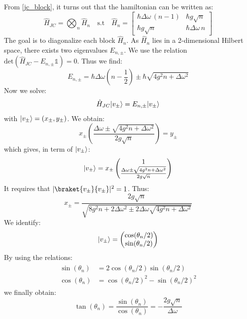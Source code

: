 \documentclass[11pt]{report}
\DeclarePairedDelimiter\ket{\lvert}{\rangle}
\begin{document}
From \ref{jc_block}, it turns out that the hamiltonian can be written as:
\begin{equation}
\hat{H}_{JC} = \bigotimes_n \hat{H}_n \quad \textrm{s.t} \quad \hat{H}_n = \begin{bmatrix}
\hbar \Delta\omega \, (n-1) & \hbar g \sqrt{n}\\
\hbar g \sqrt{n} & \hbar \Delta\omega \, n
\end{bmatrix}
\end{equation}
The goal is to diagonalize each block $\hat{H}_n$. As $\hat{H}_n$ lies in a 2-dimensional Hilbert space, there exists two eigenvalues $E_{n,\pm}$. We use the relation $\textrm{det}(\hat{H}_{JC} - E_{n,\pm}\mathbb{1}) = 0$. Thus we find:
\begin{equation}
E_{n,\pm} = \hbar\Delta\omega(n-\frac{1}{2}) \pm \hbar\sqrt{4g^2 n + \Delta\omega^2}
\end{equation}
Now we solve:
\begin{equation}
\hat{H}_{JC} \ket{v_\pm} = E_{n,\pm}\ket{v_\pm}
\end{equation}
with $\ket{v_\pm}=(x_\pm,y_\pm)$. We obtain:
\begin{equation}
x_\pm \left( \frac{\Delta\omega \pm \sqrt{4g^2n + \Delta\omega^2}}{2g\sqrt{n}} \right) = y_\pm
\end{equation}
which gives, in term of $\ket{v_\pm}$:
\begin{equation}
\ket{v_\pm} = x_\pm \begin{pmatrix}
1\\
\frac{\Delta\omega \pm \sqrt{4g^2n + \Delta\omega^2}}{2g\sqrt{n}}
\end{pmatrix}
\end{equation}
It requires that $\vert\braket{v_\pm}{v_\pm}\vert^2 = 1$. Thus:
\begin{equation}
x_\pm = \frac{2g\sqrt{n}}{\sqrt{8g^2n + 2\Delta\omega^2 \pm 2\Delta\omega \sqrt{4g^2n + \Delta\omega^2}}}
\end{equation}
We identify:
\begin{equation}
\ket{v_\pm} = \begin{pmatrix}
\cos(\theta_n/2)\\
\sin(\theta_n/2)
\end{pmatrix}
\end{equation}
By using the relations:
\begin{align}
\begin{split}
\sin(\theta_n) &= 2\cos(\theta_n/2)\sin(\theta_n/2)\\
\cos(\theta_n) &= \cos(\theta_n/2)^2 - \sin(\theta_n/2)^2
\end{split}
\end{align}
we finally obtain:
\begin{equation}
\tan(\theta_n) = \frac{\sin(\theta_n)}{\cos(\theta_n)} = -\frac{2g\sqrt{n}}{\Delta\omega}
\end{equation}
\end{document}
